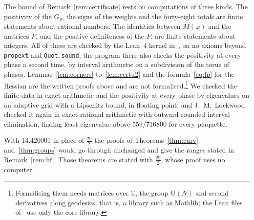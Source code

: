 \documentclass[aps,prd,twocolumn,superscriptaddress,nofootinbib,longbibliography,floatfix,amsmath,amssymb,10pt]{revtex4-2}
\theoremstyle{definition}
\theoremstyle{remark}
\newcommand{\C}{\mathbb{C}}
\newcommand{\U}{\mathrm{U}}
\begin{document}
The bound of Remark~\ref{rem:certificate} rests on computations of three
kinds. The positivity of the $G_y$, the signs of the weights and the
forty-eight totals are finite statements about rational numbers. The
identities between $M(\varphi)$ and the matrices $P$, and the positive
definiteness of the $P$, are finite statements about integers. All of
these are checked by the Lean~4 kernel in~\cite{Rom26}, on no axioms beyond
\texttt{propext} and \texttt{Quot.sound}; the program there also checks
the positivity at every phase a second time, by interval arithmetic on a
subdivision of the torus of phases. Lemmas~\ref{lem:corners}
to~\ref{lem:certu2} and the formula~\eqref{eq:fp} for the Hessian are the
written proofs above and are not formalised.\footnote{Formalising them
needs matrices over $\C$, the group $\U(N)$ and second derivatives along
geodesics, that is, a library such as Mathlib; the Lean files
of~\cite{Rom26} use only the core library.} We checked the finite data in
exact arithmetic and the positivity at every phase by eigenvalues on an
adaptive grid with a Lipschitz bound, in floating point, and
J.~M.~Lockwood checked it again in exact rational arithmetic with
outward-rounded interval elimination, finding least eigenvalue above
$559/716800$ for every plaquette.

With $14.420001$ in place of $\frac{29}2$ the proofs of
Theorems~\ref{thm:curv} and~\ref{thm:groups} would go through unchanged
and give the ranges stated in Remark~\ref{rem:hf}. Those theorems are
stated with $\frac{29}2$, whose proof uses no computer.

\def\bibsection{\par\vskip10pt\noindent\hfil\rule{0.5\columnwidth}{0.4pt}\hfil\par\vskip8pt}
\end{document}
